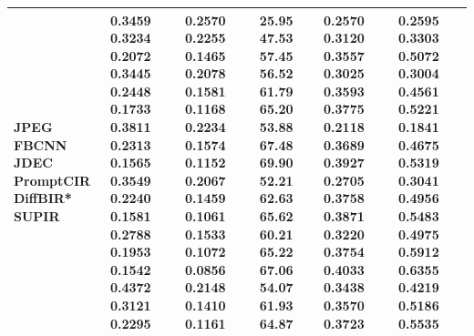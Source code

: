 \begin{tabular}{llllll}
\toprule
JPEG FBCNN JDEC PromptCIR DiffBIR* SUPIR & 0.3459 0.3234 0.2072 0.3445 0.2448 0.1733 0.3811 0.2313 0.1565 0.3549 0.2240 0.1581 0.2788 0.1953 0.1542 0.4372 0.3121 0.2295 & 0.2570 0.2255 0.1465 0.2078 0.1581 0.1168 0.2234 0.1574 0.1152 0.2067 0.1459 0.1061 0.1533 0.1072 0.0856 0.2148 0.1410 0.1161 & 25.95 47.53 57.45 56.52 61.79 65.20 53.88 67.48 69.90 52.21 62.63 65.62 60.21 65.22 67.06 54.07 61.93 64.87 & 0.2570 0.3120 0.3557 0.3025 0.3593 0.3775 0.2118 0.3689 0.3927 0.2705 0.3758 0.3871 0.3220 0.3754 0.4033 0.3438 0.3570 0.3723 & 0.2595 0.3303 0.5072 0.3004 0.4561 0.5221 0.1841 0.4675 0.5319 0.3041 0.4956 0.5483 0.4975 0.5912 0.6355 0.4219 0.5186 0.5535 \\
\midrule
\bottomrule
\end{tabular}
